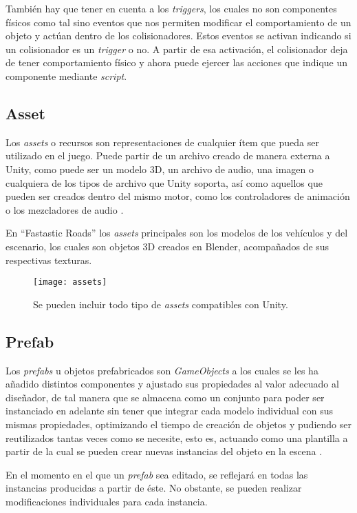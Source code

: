 También hay que tener en cuenta a los \textit{triggers}, los cuales no son componentes físicos como tal sino eventos que nos permiten modificar el comportamiento de un objeto y actúan dentro de los colisionadores. Estos eventos se activan indicando si un colisionador es un \textit{trigger} o no. A partir de esa activación, el colisionador deja de tener comportamiento físico y ahora puede ejercer las acciones que indique un componente mediante \textit{script}.

\subsection{Asset}

Los \textit{assets} o recursos son representaciones de cualquier ítem que pueda ser utilizado en el juego. Puede partir de un archivo creado de manera externa a Unity, como puede ser un modelo 3D, un archivo de audio, una imagen o cualquiera de los tipos de archivo que Unity soporta, así como aquellos que pueden ser creados dentro del mismo motor, como los controladores de animación o los mezcladores de audio \cite{doc:assets}.

En ``Fastastic Roads'' los \textit{assets} principales son los modelos de los vehículos y del escenario, los cuales son objetos 3D creados en Blender, acompañados de sus respectivas texturas.

\begin{figure}[h]
	\centering
	\texttt{[image: assets]}
	\caption{Se pueden incluir todo tipo de \textit{assets} compatibles con Unity.}
	\label{fig:assets}
\end{figure}

\subsection{Prefab}

Los \textit{prefabs} u objetos prefabricados son \textit{GameObjects} a los cuales se les ha añadido distintos componentes y ajustado sus propiedades al valor adecuado al diseñador, de tal manera que se almacena como un conjunto para poder ser instanciado en adelante sin tener que integrar cada modelo individual con sus mismas propiedades, optimizando el tiempo de creación de objetos y pudiendo ser reutilizados tantas veces como se necesite, esto es, actuando como una plantilla a partir de la cual se pueden crear nuevas instancias del objeto en la escena \cite{doc:prefabs}.

En el momento en el que un \textit{prefab} sea editado, se reflejará en todas las instancias producidas a partir de éste. No obstante, se pueden realizar modificaciones individuales para cada instancia.

